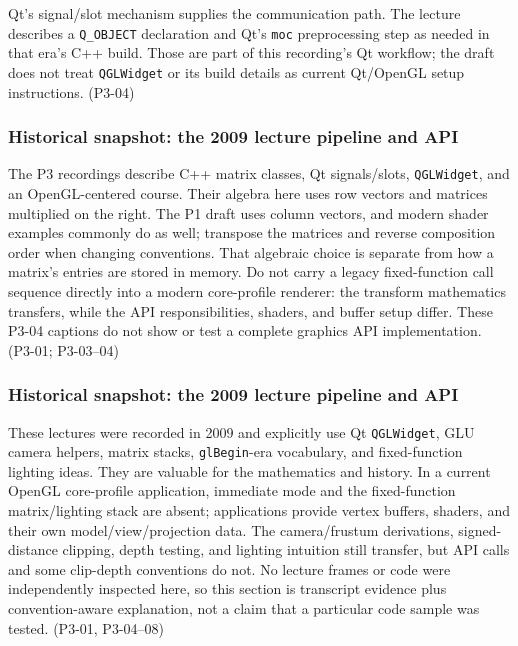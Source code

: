 Qt's signal/slot mechanism supplies the communication path. The lecture describes a \texttt{Q\_OBJECT} declaration and Qt's \texttt{moc} preprocessing step as needed in that era's C++ build. Those are part of this recording's Qt workflow; the draft does not treat \texttt{QGLWidget} or its build details as current Qt/OpenGL setup instructions. (P3-04)

\subsubsection{Historical snapshot: the 2009 lecture pipeline and API}\label{03-visual-computing-i-ch018-historical-snapshot-the-2009-lecture-pipeline-and-api}

The P3 recordings describe C++ matrix classes, Qt signals/slots, \texttt{QGLWidget}, and an OpenGL-centered course. Their algebra here uses row vectors and matrices multiplied on the right. The P1 draft uses column vectors, and modern shader examples commonly do as well; transpose the matrices and reverse composition order when changing conventions. That algebraic choice is separate from how a matrix's entries are stored in memory. Do not carry a legacy fixed-function call sequence directly into a modern core-profile renderer: the transform mathematics transfers, while the API responsibilities, shaders, and buffer setup differ. These P3-04 captions do not show or test a complete graphics API implementation. (P3-01; P3-03--04)

\subsubsection{Historical snapshot: the 2009 lecture pipeline and API}\label{03-visual-computing-i-ch018-historical-snapshot-the-2009-lecture-pipeline-and-api-1}

These lectures were recorded in 2009 and explicitly use Qt \texttt{QGLWidget}, GLU camera helpers, matrix stacks, \texttt{glBegin}-era vocabulary, and fixed-function lighting ideas. They are valuable for the mathematics and history. In a current OpenGL core-profile application, immediate mode and the fixed-function matrix/lighting stack are absent; applications provide vertex buffers, shaders, and their own model/view/projection data. The camera/frustum derivations, signed-distance clipping, depth testing, and lighting intuition still transfer, but API calls and some clip-depth conventions do not. No lecture frames or code were independently inspected here, so this section is transcript evidence plus convention-aware explanation, not a claim that a particular code sample was tested. (P3-01, P3-04--08)

